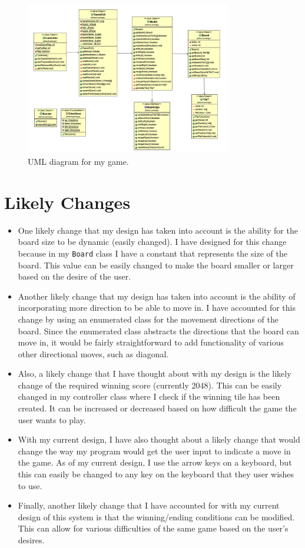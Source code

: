 \documentclass[12pt]{article}
\begin{document}
\begin{figure}[h]
    \centering
    \includegraphics[width=0.8\textwidth]{A4uml.png}
    \caption{UML diagram for my game.}
    \label{Figure 2:}
\end{figure} 

\newpage

\section{Likely Changes}
\begin{itemize}
  \item One likely change that my design has taken into account is the ability for the board size to be dynamic (easily changed). I have designed for this change because in my \verb|Board| class I have a constant that represents the size of the board. This value can be easily changed to make the board smaller or larger based on the desire of the user. 
  \item Another likely change that my design has taken into account is the ability of incorporating more direction to be able to move in. I have accounted for this change by using an enumerated class for the movement directions of the board. Since the enumerated class abstracts the directions that the board can move in, it would be fairly straightforward to add functionality of various other directional moves, such as diagonal. 
  \item Also, a likely change that I have thought about with my design is the likely change of the required winning score (currently 2048). This can be easily changed in my controller class where I check if the winning tile has been created. It can be increased or decreased based on how difficult the game the user wants to play. 
  \item With my current design, I have also thought about a likely change that would change the way my program would get the user input to indicate a move in the game. As of my current design, I use the arrow keys on a keyboard, but this can easily be changed to any key on the keyboard that they user wishes to use.
  \item Finally, another likely change that I have accounted for with my current design of this system is that the winning/ending conditions can be modified. This can allow for various difficulties of the same game based on the user's desires.
\end{itemize}
\end{document}
